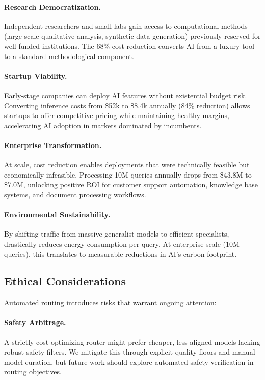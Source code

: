 \paragraph{Research Democratization.} Independent researchers and small labs gain access to computational methods (large-scale qualitative analysis, synthetic data generation) previously reserved for well-funded institutions. The 68\% cost reduction converts AI from a luxury tool to a standard methodological component.

\paragraph{Startup Viability.} Early-stage companies can deploy AI features without existential budget risk. Converting inference costs from \$52k to \$8.4k annually (84\% reduction) allows startups to offer competitive pricing while maintaining healthy margins, accelerating AI adoption in markets dominated by incumbents.

\paragraph{Enterprise Transformation.} At scale, cost reduction enables deployments that were technically feasible but economically infeasible. Processing 10M queries annually drops from \$43.8M to \$7.0M, unlocking positive ROI for customer support automation, knowledge base systems, and document processing workflows.

\paragraph{Environmental Sustainability.} By shifting traffic from massive generalist models to efficient specialists, \ours{} drastically reduces energy consumption per query. At enterprise scale (10M queries), this translates to measurable reductions in AI's carbon footprint.

\subsection{Ethical Considerations}

Automated routing introduces risks that warrant ongoing attention:

\paragraph{Safety Arbitrage.} A strictly cost-optimizing router might prefer cheaper, less-aligned models lacking robust safety filters. We mitigate this through explicit quality floors and manual model curation, but future work should explore automated safety verification in routing objectives.

